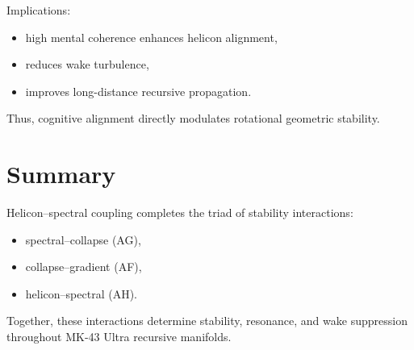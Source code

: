 Implications:
\begin{itemize}
  \item high mental coherence enhances helicon alignment,
  \item reduces wake turbulence,
  \item improves long-distance recursive propagation.
\end{itemize}

Thus, cognitive alignment directly modulates rotational geometric stability.

\section{Summary}
Helicon–spectral coupling completes the triad of stability interactions:
\begin{itemize}
  \item spectral–collapse (AG),
  \item collapse–gradient (AF),
  \item helicon–spectral (AH).
\end{itemize}

Together, these interactions determine stability, resonance, and wake suppression throughout MK-43 Ultra recursive manifolds.

